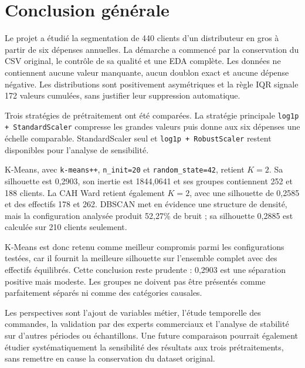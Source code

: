 \chapter{Conclusion générale}

Le projet a étudié la segmentation de 440 clients d'un distributeur en gros à partir de six dépenses annuelles. La démarche a commencé par la conservation du CSV original, le contrôle de sa qualité et une EDA complète. Les données ne contiennent aucune valeur manquante, aucun doublon exact et aucune dépense négative. Les distributions sont positivement asymétriques et la règle IQR signale 172 valeurs cumulées, sans justifier leur suppression automatique.

Trois stratégies de prétraitement ont été comparées. La stratégie principale \texttt{log1p + StandardScaler} compresse les grandes valeurs puis donne aux six dépenses une échelle comparable. StandardScaler seul et \texttt{log1p + RobustScaler} restent disponibles pour l'analyse de sensibilité.

K-Means, avec \texttt{k-means++}, \texttt{n\_init=20} et \texttt{random\_state=42}, retient $K=2$. Sa silhouette est 0,2903, son inertie est 1844,0641 et ses groupes contiennent 252 et 188 clients. La CAH Ward retient également $K=2$, avec une silhouette de 0,2585 et des effectifs 178 et 262. DBSCAN met en évidence une structure de densité, mais la configuration analysée produit 52,27\% de bruit ; sa silhouette 0,2885 est calculée sur 210 clients seulement.

K-Means est donc retenu comme meilleur compromis parmi les configurations testées, car il fournit la meilleure silhouette sur l'ensemble complet avec des effectifs équilibrés. Cette conclusion reste prudente : 0,2903 est une séparation positive mais modeste. Les groupes ne doivent pas être présentés comme parfaitement séparés ni comme des catégories causales.

Les perspectives sont l'ajout de variables métier, l'étude temporelle des commandes, la validation par des experts commerciaux et l'analyse de stabilité sur d'autres périodes ou échantillons. Une future comparaison pourrait également étudier systématiquement la sensibilité des résultats aux trois prétraitements, sans remettre en cause la conservation du dataset original.
